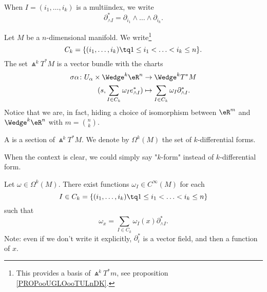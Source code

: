 When \( I=(i_1,\ldots,i_k)\) is a multiindex, we write
\begin{equation}
	\partial^*_{\wedge I}=\partial_{i_1}\wedge\ldots\wedge\partial_{i_k}.
\end{equation}


\begin{propositionDef}		\label{DEFooZELVooFfosEn}
	Let \( M\) be a \( n\)-dimensional manifold. We write\footnote{This provides a basis of \( \Wedge^kT^*m\), see proposition \ref{PROPooUGLOooTULnDK}.}
	\begin{equation}
		C_k=\{ (i_1,\ldots,i_k)\tq 1\leq i_1<\ldots <i_k\leq n \}.
	\end{equation}
	The set \( \Wedge^kT^*M\) is a vector bundle with the charts
	\begin{equation}		\label{EQooOMWMooKKWhqf}
		\begin{aligned}
			\sigma{\alpha}\colon U_{\alpha}\times \Wedge^k\eR^n & \to \Wedge^kT^*M                                      \\
			(s,\sum_{I\in C_k}\omega_Ie^*_{\wedge I})           & \mapsto \sum_{I\in C_k}\omega_I\partial^*_{\wedge I}.
		\end{aligned}
	\end{equation}
	Notice that we are, in fact, hiding a choice of isomorphism between \( \eR^m\) and \( \Wedge^k\eR^n\) with \( m=\binom{ n }{ k }\).
\end{propositionDef}

\noproof

\begin{definition}
	A  is a section of \( \Wedge^kT^*M\). We denote by \( \Omega^k(M)\) the set of \( k\)-differential forms.

	When the context is clear, we could simply say "\( k\)-form" instead of \( k\)-differential form.
\end{definition}

\begin{proposition}		\label{PROPooNOGKooQedJba}
	Let \( \omega\in \Omega^k(M)\). There exist functions \( \omega_I\in C^{\infty}(M)\) for each
	\begin{equation}
		I\in C_k=\{ (i_1,\ldots,i_k)\tq 1\leq i_1<\ldots <i_k\leq n \}
	\end{equation}
	such that
	\begin{equation}
		\omega_x=\sum_{I\in C_k}\omega_I(x)\partial^*_{\wedge I}.
	\end{equation}
	Note: even if we don't write it explicitly, \( \partial^*_i\) is a vector field, and then a function of \( x\).
\end{proposition}

